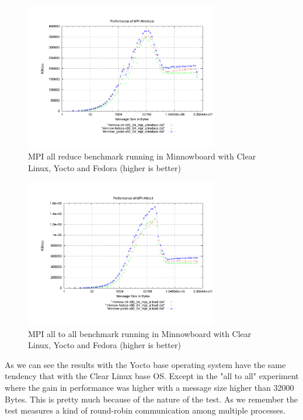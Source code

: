 \begin{figure}[H]
\centering
\includegraphics[width=0.75\textwidth]{images/mpbench_yocto_experiments/mpi_allreduce.pdf}
\caption{MPI all reduce benchmark running in Minnowboard with Clear Linux,
Yocto and Fedora (higher is better)}
\label{mpi_allreduce_yocto}
\end{figure}

\begin{figure}[H]
\centering
\includegraphics[width=0.75\textwidth]{images/mpbench_yocto_experiments/mpi_alltoall.pdf}
\caption{MPI all to all benchmark running in Minnowboard with Clear Linux, Yocto
and Fedora (higher is better)}
\label{mpi_all_to_all_yocto}
\end{figure}

As we can see the results with the Yocto base operating system have the same
tendency that with the Clear Linux base OS. Except in the "all to all"
experiment where the gain in performance was higher with a message size higher
than 32000 Bytes. This is pretty much because of the nature of the test. As we
remember the test measures a kind of round-robin communication among multiple
processes.

